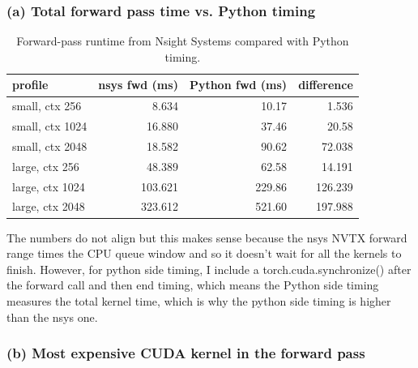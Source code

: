 \documentclass[11pt]{article}
\begin{document}
\subsubsection*{(a) Total forward pass time vs. Python timing}

\begin{table}[H]
\centering
\footnotesize
\caption{Forward-pass runtime from Nsight Systems compared with Python timing.}
\setlength{\tabcolsep}{4pt}
\begin{tabular}{lrrr}
\toprule
profile & nsys fwd (ms) & Python fwd (ms) & difference \\
\midrule
small, ctx 256 & 8.634 & 10.17 & 1.536 \\
small, ctx 1024 & 16.880 & 37.46 & 20.58 \\
small, ctx 2048 & 18.582 & 90.62 & 72.038 \\
large, ctx 256 & 48.389 & 62.58 & 14.191 \\
large, ctx 1024 & 103.621 & 229.86 & 126.239 \\
large, ctx 2048 & 323.612 & 521.60 & 197.988 \\
\bottomrule
\end{tabular}
\end{table}

The numbers do not align but this makes sense because the nsys NVTX forward range times the CPU queue window and so it doesn't wait for all the kernels to finish.
However, for python side timing, I include a torch.cuda.synchronize() after the forward call and then end timing, which means the Python side timing measures the total kernel time, which is why the python side timing is higher than the nsys one.

\subsubsection*{(b) Most expensive CUDA kernel in the forward pass}
\end{document}
